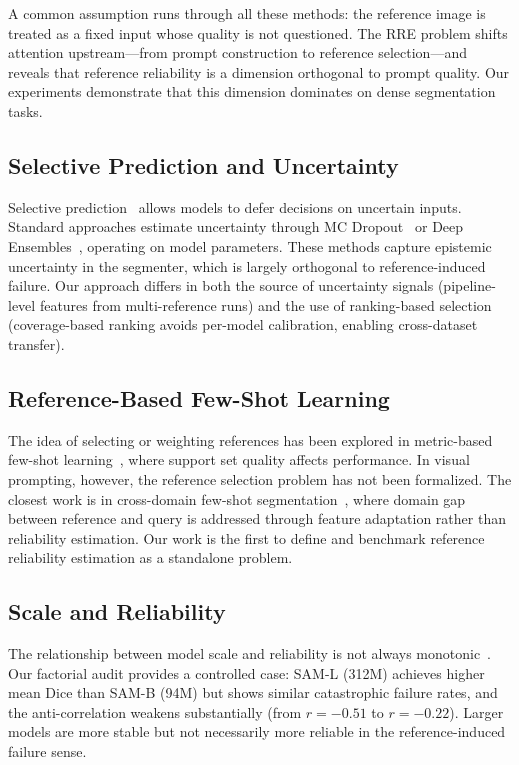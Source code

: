\documentclass[11pt]{article}
\begin{document}
A common assumption runs through all these methods: the reference image is
treated as a fixed input whose quality is not questioned. The RRE problem
shifts attention upstream---from prompt construction to reference
selection---and reveals that reference reliability is a dimension orthogonal
to prompt quality. Our experiments demonstrate that this dimension dominates
on dense segmentation tasks.

\subsection{Selective Prediction and Uncertainty}

Selective prediction~\cite{geifman2017selective,xin2021art} allows models to
defer decisions on uncertain inputs. Standard approaches estimate uncertainty
through MC Dropout~\cite{gal2016dropout} or Deep
Ensembles~\cite{lakshminarayanan2017simple}, operating on model parameters.
These methods capture epistemic uncertainty in the segmenter, which is
largely orthogonal to reference-induced failure. Our approach differs in
both the source of uncertainty signals (pipeline-level features from
multi-reference runs) and the use of ranking-based selection (coverage-based
ranking avoids per-model calibration, enabling cross-dataset transfer).

\subsection{Reference-Based Few-Shot Learning}

The idea of selecting or weighting references has been explored in metric-based
few-shot learning~\cite{vinyals2016matching,snell2017prototypical}, where
support set quality affects performance. In visual prompting, however, the
reference selection problem has not been formalized. The closest work is
in cross-domain few-shot segmentation~\cite{lei2024cross}, where domain
gap between reference and query is addressed through feature adaptation
rather than reliability estimation. Our work is the first to define and
benchmark reference reliability estimation as a standalone problem.

\subsection{Scale and Reliability}

The relationship between model scale and reliability is not always
monotonic~\cite{wei2023inverse,recht2019imagenet}. Our factorial audit
provides a controlled case: SAM-L (312M) achieves higher mean Dice than
SAM-B (94M) but shows similar catastrophic failure rates, and the
anti-correlation weakens substantially (from $r=-0.51$ to $r=-0.22$).
Larger models are more stable but not necessarily more reliable in the
reference-induced failure sense.
\end{document}
